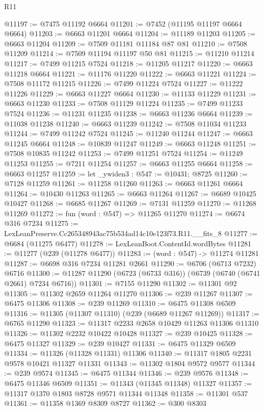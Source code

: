\begin{lexlean}{R11}
\begin{coremodule}
@11197 := @7475 @11192 @6664
@11201 := @7452 (@11195 @11197 @6664 @6664)
@11203 := @6663 @11201 @6664
@11204 := @11189 @11203
@11205 := @6663 @11204
@11209 := @7509 @11181 @11184 @87 @81
@11210 := @7508 @11209
@11214 := @7509 @11194 @11197 @50 @81
@11215 := @11210 @11214
@11217 := @7499 @11215 @7524
@11218 := @11205 @11217
@11220 := @6663 @11218 @6664
@11221 := @11176 @11220
@11222 := @6663 @11221
@11224 := @7508 @11172 @11215
@11226 := @7499 @11224 @7524
@11227 := @11222 @11226
@11229 := @6663 @11227 @6664
@11230 := @11133 @11229
@11231 := @6663 @11230
@11233 := @7508 @11129 @11224
@11235 := @7499 @11233 @7524
@11236 := @11231 @11235
@11238 := @6663 @11236 @6664
@11239 := @11038 @11238
@11240 := @6663 @11239
@11242 := @7508 @11034 @11233
@11244 := @7499 @11242 @7524
@11245 := @11240 @11244
@11247 := @6663 @11245 @6664
@11248 := @10839 @11247
@11249 := @6663 @11248
@11251 := @7508 @10835 @11242
@11253 := @7499 @11251 @7524
@11254 := @11249 @11253
@11255 := @7211 @11254
@11257 := @6663 @11255 @6664
@11258 := @6663 @11257
@11259 := let _ywiden3 : @547 := @10431; @8725
@11260 := @7128 @11259
@11261 := @11258 @11260
@11263 := @6663 @11261 @6664
@11264 := @10430 @11263
@11265 := @6663 @11264
@11267 := @6689 @10425 @10427
@11268 := @6685 @11267
@11269 := @7131 @11259
@11270 := @11268 @11269
@11272 := fun (word : @547) => @11265 @11270
@11274 := @6674 @316 @7234
@11275 := LexLeanPreserve.Cc265348943ac75b534ad14c10e123f73.R11.__fits_8
@11277 := @6684 (@11275 @6477)
@11278 := LexLeanBoot.ContentId.wordBytes
@11281 := @11277 (@239 (@11278 @6477))
@11283 := (word : @547) -> @11274 @11281
@11287 := @6698 @316 @7234 @11281 @2661
@11290 := @6706 (@6713 @7232) @6716
@11300 := @11287 @11290 (@6723 (@6733 @316)) (@6739 (@6740 (@6741 @2661) @7234 @6716))
@11301 := @7155 @11290
@11302 := @11301 @92
@11305 := @11302 @2659 @11264 @11270
@11306 := @239 @11267
@11307 := @6475 @11306
@11308 := @239 @11269
@11310 := @6475 @11308 @6509
@11316 := @11305 (@11307 @11310) (@239 (@6689 @11267 @11269))
@11317 := @6765 @11290
@11323 := @11317 @2233 @2658 @10429 @11263 @11306 @11310
@11326 := @11302 @2232 @10422 @10428
@11327 := @239 @10425
@11328 := @6475 @11327
@11329 := @239 @10427
@11331 := @6475 @11329 @6509
@11334 := @11326 (@11328 @11331) @11306
@11340 := @11317 @1805 @2231 @9578 @10421 @11327 @11331
@11343 := @11302 @1804 @9572 @9577
@11344 := @239 @9574
@11345 := @6475 @11344
@11346 := @239 @9576
@11348 := @6475 @11346 @6509
@11351 := @11343 (@11345 @11348) @11327
@11357 := @11317 @1370 @1803 @8728 @9571 @11344 @11348
@11358 := @11301 @537
@11361 := @11358 @1369 @8309 @8727
@11362 := @300 @8303

\end{coremodule}
\end{lexlean}
